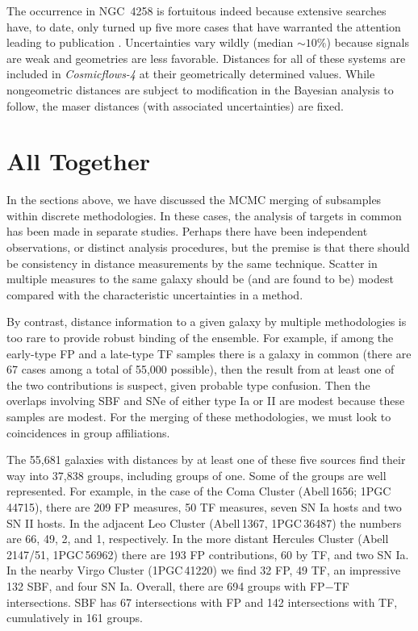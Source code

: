 \documentclass[twocolumn]{aastex63}
\begin{document}
The occurrence in NGC~4258 is fortuitous indeed because extensive searches have, to date, only turned up five more cases that have warranted the attention leading to publication \citep{2020ApJ...891L...1P}.  Uncertainties vary wildly (median $\sim10\%$) because signals are weak and geometries are less favorable.  Distances for all of these systems are included in {\it Cosmicflows-4} at their geometrically determined values.  While nongeometric distances are subject to modification in the Bayesian analysis to follow, the maser distances (with associated uncertainties) are fixed.


\section{All Together}
\label{sec:all}

In the sections above, we have discussed the MCMC merging of subsamples within discrete methodologies.  In these cases, the analysis of targets in common has been made in separate studies.  Perhaps there have been independent observations, or distinct analysis procedures, but the premise is that there should be consistency in distance measurements by the same technique.  Scatter in multiple measures to the same galaxy should be (and are found to be) modest compared with the characteristic uncertainties in a method.

By contrast, distance information to a given galaxy by multiple methodologies is too rare to provide robust binding of the ensemble.  For example, if among the early-type FP and a late-type TF samples there is a galaxy in common (there are 67 cases among a total of 55,000 possible), then the result from at least one of the two contributions is suspect, given probable type confusion.  Then the overlaps involving SBF and SNe of either type Ia or II are modest because these samples are modest.  For the merging of these methodologies, we must look to coincidences in group affiliations.

The 55,681 galaxies with distances by at least one of these five sources find their way into 37,838 groups, including groups of one.  Some of the groups are well represented.  For example, in the case of the Coma Cluster (Abell\,1656; 1PGC\,44715), there are 209 FP measures, 50 TF measures, seven SN Ia hosts and two SN II hosts.  In the adjacent Leo Cluster (Abell\,1367, 1PGC\,36487) the numbers are 66, 49, 2, and 1, respectively.  In the more distant Hercules Cluster (Abell\,2147/51, 1PGC\,56962) there are 193 FP contributions, 60 by TF, and two SN Ia.  In the nearby Virgo Cluster (1PGC\,41220) we find 32 FP, 49 TF, an impressive 132 SBF, and four SN Ia.  Overall, there are 694 groups with FP$-$TF intersections.  SBF has 67 intersections with FP and 142 intersections with TF, cumulatively in 161 groups.
\end{document}
